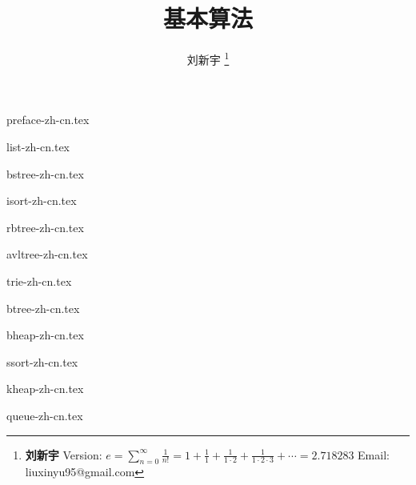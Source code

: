 \documentclass[zihao=5, b5paper, twoside, heading=true]{ctexbook}
\begin{document}


\title{
  {\bf \Huge 基本算法}
  \centering
}

\author{刘新宇
  \thanks{{\bfseries 刘新宇} \newline
    Version: $\displaystyle e = \sum \limits _{n=0}^{\infty }{\frac {1}{n!}} = 1 + {\frac {1}{1}}+{\frac {1}{1\cdot 2}}+{\frac {1}{1\cdot 2\cdot 3}}+\cdots = 2.718283$ \newline
    Email: liuxinyu95@gmail.com \newline
    }}

\maketitle

\frontmatter
{preface-zh-cn.tex}

\tableofcontents
\newpage

\mainmatter

{list-zh-cn.tex}

{bstree-zh-cn.tex}

{isort-zh-cn.tex}

{rbtree-zh-cn.tex}

{avltree-zh-cn.tex}

{trie-zh-cn.tex}

{btree-zh-cn.tex}

{bheap-zh-cn.tex}

{ssort-zh-cn.tex}

{kheap-zh-cn.tex}

{queue-zh-cn.tex}
\end{document}
